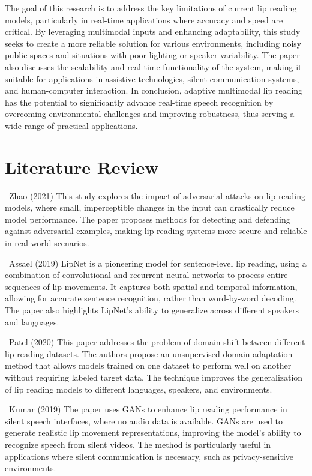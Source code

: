 \documentclass[conference]{IEEEtran}
\begin{document}
The goal of this research is to address the key limitations of current lip reading models, particularly in real-time applications where accuracy and speed are critical. By leveraging multimodal inputs and enhancing adaptability, this study seeks to create a more reliable solution for various environments, including noisy public spaces and situations with poor lighting or speaker variability. The paper also discusses the scalability and real-time functionality of the system, making it suitable for applications in assistive technologies, silent communication systems, and human-computer interaction.
In conclusion, adaptive multimodal lip reading has the potential to significantly advance real-time speech recognition by overcoming environmental challenges and improving robustness, thus serving a wide range of practical applications.

\section{Literature Review}\ Zhao (2021) This study explores the impact of adversarial attacks on lip-reading models, where small, imperceptible changes in the input can drastically reduce model performance. The paper proposes methods for detecting and defending against adversarial examples, making lip reading systems more secure and reliable in real-world scenarios.

\ Assael (2019) LipNet is a pioneering model for sentence-level lip reading, using a combination of convolutional and recurrent neural networks to process entire sequences of lip movements. It captures both spatial and temporal information, allowing for accurate sentence recognition, rather than word-by-word decoding. The paper also highlights LipNet’s ability to generalize across different speakers and languages.

\ Patel (2020) This paper addresses the problem of domain shift between different lip reading datasets. The authors propose an unsupervised domain adaptation method that allows models trained on one dataset to perform well on another without requiring labeled target data. The technique improves the generalization of lip reading models to different languages, speakers, and environments.

\ Kumar (2019) The paper uses GANs to enhance lip reading performance in silent speech interfaces, where no audio data is available. GANs are used to generate realistic lip movement representations, improving the model's ability to recognize speech from silent videos. The method is particularly useful in applications where silent communication is necessary, such as privacy-sensitive environments.
\end{document}
